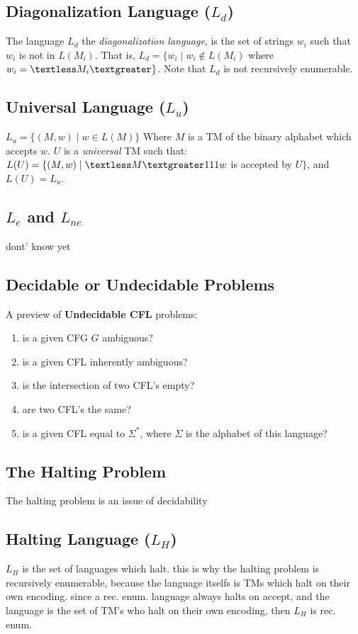 \documentclass[20pt]{article} %
\begin{document}
\subsection{Diagonalization Language ($L_d$)}
The language $L_d$ the \textit{diagonalization language}, is the set of strings $w_i$ such that $w_i$ is not in $L(M_i)$.  That is, $L_d = \{ w_i \mid w_i \notin L(M_i)$ where $w_i = \textless M_i \textgreater \}$.  Note that $L_d$ is not recursively enumerable.
\subsection{Universal Language ($L_u$)}
$L_u = \{ (M, w) \mid w \in L(M)\}$ Where $M$ is a TM of the binary alphabet which accepts $w$. $U$ is a \textit{universal} TM such that: $L(U) = \{ (M,w) \mid \textless M \textgreater 111 w$ is accepted by $U \}$, and $L(U) = L_u$.
\subsection{$L_e$ and $L_{ne}$}
dont' know yet
\subsection{Decidable or Undecidable Problems}
A preview of \textbf{Undecidable CFL} problems:
\begin{enumerate}
\item is a given CFG $G$ ambiguous?
\item is a given CFL inherently ambiguous?
\item is the intersection of two CFL's empty?
\item are two CFL's the same?
\item is a given CFL equal to $\Sigma^{*}$, where $\Sigma$ is the alphabet of this language?
\end{enumerate}
\subsection{The Halting Problem}
The halting problem is an issue of decidability
\subsection{Halting Language ($L_H$)}
$L_H$ is the set of languages which halt.  this is why the halting problem is recursively enumerable, because the language itselfs is TMs which halt on their own encoding.  since a rec. enum. language always halts on accept, and the language is the set of TM's who halt on their own encoding, then $L_H$ is rec. enum.
\end{document}
